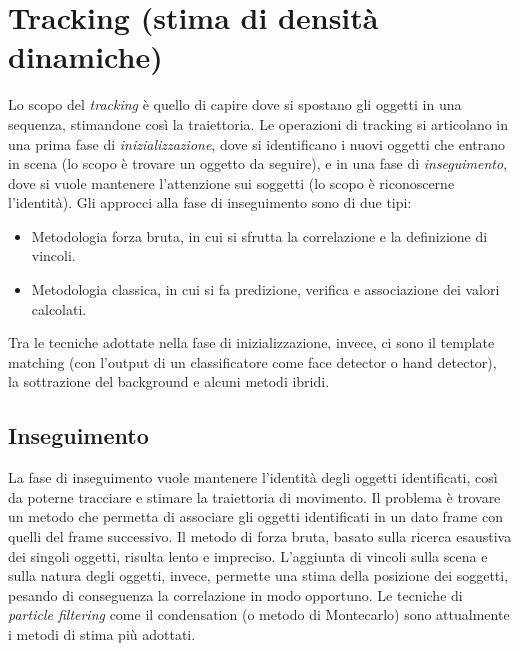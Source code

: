\documentclass[a4paper,oneside,titlepage]{book}
\begin{document}
\section{Tracking (stima di densità dinamiche)}
Lo scopo del \textit{tracking} è quello di capire dove si spostano gli oggetti in una sequenza, stimandone così la traiettoria. Le operazioni di tracking si articolano in una prima fase di \textit{inizializzazione}, dove si identificano i nuovi oggetti che entrano in scena (lo scopo è trovare un oggetto da seguire), e in una fase di \textit{inseguimento}, dove si vuole mantenere l'attenzione sui soggetti (lo scopo è riconoscerne l'identità). Gli approcci alla fase di inseguimento sono di due tipi:
\begin{itemize}
    \item Metodologia forza bruta, in cui si sfrutta la correlazione e la definizione di vincoli.
    \item Metodologia classica, in cui si fa predizione, verifica e associazione dei valori calcolati.
\end{itemize}
Tra le tecniche adottate nella fase di inizializzazione, invece, ci sono il template matching (con l'output di un classificatore come face detector o hand detector), la sottrazione del background e alcuni metodi ibridi.

\subsection{Inseguimento}
La fase di inseguimento vuole mantenere l'identità degli oggetti identificati, così da poterne tracciare e stimare la traiettoria di movimento. Il problema è trovare un metodo che permetta di associare gli oggetti identificati in un dato frame con quelli del frame successivo. Il metodo di forza bruta, basato sulla ricerca esaustiva dei singoli oggetti, risulta lento e impreciso. L'aggiunta di vincoli sulla scena e sulla natura degli oggetti, invece, permette una stima della posizione dei soggetti, pesando di conseguenza la correlazione in modo opportuno. Le tecniche di \textit{particle filtering} come il condensation (o metodo di Montecarlo) sono attualmente i metodi di stima più adottati.
\end{document}
